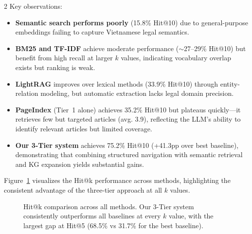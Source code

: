 \documentclass[11pt,a4paper]{article}
\begin{document}
\begin{multicols}{2}
Key observations:
\begin{itemize}
\item \textbf{Semantic search performs poorly} (15.8\% Hit@10) due to general-purpose embeddings failing to capture Vietnamese legal semantics.
\item \textbf{BM25 and TF-IDF} achieve moderate performance ($\sim$27--29\% Hit@10) but benefit from high recall at larger $k$ values, indicating vocabulary overlap exists but ranking is weak.
\item \textbf{LightRAG} improves over lexical methods (33.9\% Hit@10) through entity-relation modeling, but automatic extraction lacks legal domain precision.
\item \textbf{PageIndex} (Tier~1 alone) achieves 35.2\% Hit@10 but plateaus quickly---it retrieves few but targeted articles (avg. 3.9), reflecting the LLM's ability to identify relevant articles but limited coverage.
\item \textbf{Our 3-Tier system} achieves 75.2\% Hit@10 (+41.3pp over best baseline), demonstrating that combining structured navigation with semantic retrieval and KG expansion yields substantial gains.
\end{itemize}

Figure~\ref{fig:hitk-comparison} visualizes the Hit@k performance across methods, highlighting the consistent advantage of the three-tier approach at all $k$ values.

\end{multicols}

\begin{figure}[H]
\centering
{}
\caption{Hit@k comparison across all methods. Our 3-Tier system consistently outperforms all baselines at every $k$ value, with the largest gap at Hit@5 (68.5\% vs 31.7\% for the best baseline).}
\label{fig:hitk-comparison}
\end{figure}
\end{document}
